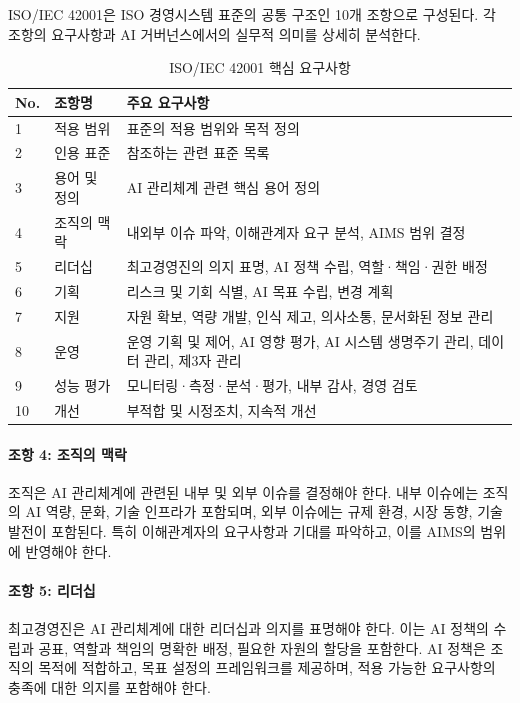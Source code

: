 ISO/IEC 42001은 ISO 경영시스템 표준의 공통 구조인 10개 조항으로 구성된다. 각 조항의 요구사항과 AI 거버넌스에서의 실무적 의미를 상세히 분석한다.

\begin{table}[htbp]
\centering
\caption{ISO/IEC 42001 핵심 요구사항}
\label{tab:iso42001_requirements}
\begin{tabularx}{\textwidth}{p{0.5cm}p{2.5cm}X}
\toprule
\textbf{No.} & \textbf{조항명} & \textbf{주요 요구사항} \\
\midrule
1 & 적용 범위 & 표준의 적용 범위와 목적 정의 \\
2 & 인용 표준 & 참조하는 관련 표준 목록 \\
3 & 용어 및 정의 & AI 관리체계 관련 핵심 용어 정의 \\
4 & 조직의 맥락 & 내외부 이슈 파악, 이해관계자 요구 분석, AIMS 범위 결정 \\
5 & 리더십 & 최고경영진의 의지 표명, AI 정책 수립, 역할·책임·권한 배정 \\
6 & 기획 & 리스크 및 기회 식별, AI 목표 수립, 변경 계획 \\
7 & 지원 & 자원 확보, 역량 개발, 인식 제고, 의사소통, 문서화된 정보 관리 \\
8 & 운영 & 운영 기획 및 제어, AI 영향 평가, AI 시스템 생명주기 관리, 데이터 관리, 제3자 관리 \\
9 & 성능 평가 & 모니터링·측정·분석·평가, 내부 감사, 경영 검토 \\
10 & 개선 & 부적합 및 시정조치, 지속적 개선 \\
\bottomrule
\end{tabularx}
\end{table}

\paragraph{조항 4: 조직의 맥락}
조직은 AI 관리체계에 관련된 내부 및 외부 이슈를 결정해야 한다. 내부 이슈에는 조직의 AI 역량, 문화, 기술 인프라가 포함되며, 외부 이슈에는 규제 환경, 시장 동향, 기술 발전이 포함된다. 특히 이해관계자의 요구사항과 기대를 파악하고, 이를 AIMS의 범위에 반영해야 한다.

\paragraph{조항 5: 리더십}
최고경영진은 AI 관리체계에 대한 리더십과 의지를 표명해야 한다. 이는 AI 정책의 수립과 공표, 역할과 책임의 명확한 배정, 필요한 자원의 할당을 포함한다. AI 정책은 조직의 목적에 적합하고, 목표 설정의 프레임워크를 제공하며, 적용 가능한 요구사항의 충족에 대한 의지를 포함해야 한다.

